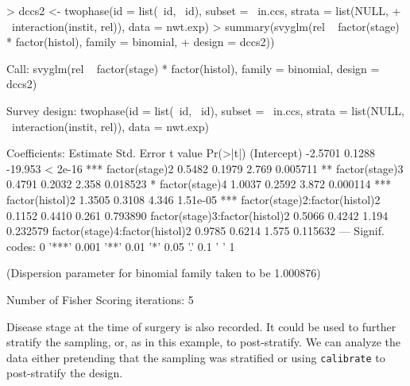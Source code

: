 \documentclass{article}
\begin{document}
\begin{Schunk}
\begin{Sinput}
> dccs2 <- twophase(id = list(~id, ~id), subset = ~in.ccs, strata = list(NULL, 
+     ~interaction(instit, rel)), data = nwt.exp)
> summary(svyglm(rel ~ factor(stage) * factor(histol), family = binomial, 
+     design = dccs2))
\end{Sinput}
\begin{Soutput}
Call:
svyglm(rel ~ factor(stage) * factor(histol), family = binomial, 
    design = dccs2)

Survey design:
twophase(id = list(~id, ~id), subset = ~in.ccs, strata = list(NULL, 
    ~interaction(instit, rel)), data = nwt.exp)

Coefficients:
                               Estimate Std. Error t value Pr(>|t|)    
(Intercept)                     -2.5701     0.1288 -19.953  < 2e-16 ***
factor(stage)2                   0.5482     0.1979   2.769 0.005711 ** 
factor(stage)3                   0.4791     0.2032   2.358 0.018523 *  
factor(stage)4                   1.0037     0.2592   3.872 0.000114 ***
factor(histol)2                  1.3505     0.3108   4.346 1.51e-05 ***
factor(stage)2:factor(histol)2   0.1152     0.4410   0.261 0.793890    
factor(stage)3:factor(histol)2   0.5066     0.4242   1.194 0.232579    
factor(stage)4:factor(histol)2   0.9785     0.6214   1.575 0.115632    
---
Signif. codes:  0 '***' 0.001 '**' 0.01 '*' 0.05 '.' 0.1 ' ' 1 

(Dispersion parameter for binomial family taken to be 1.000876)

Number of Fisher Scoring iterations: 5
\end{Soutput}
\end{Schunk}

Disease stage at the time of surgery is also recorded. It could be
used to further stratify the sampling, or, as in this example, to
post-stratify.  We can analyze the data either pretending that the
sampling was stratified or using \texttt{calibrate} to post-stratify
the design.
\end{document}
